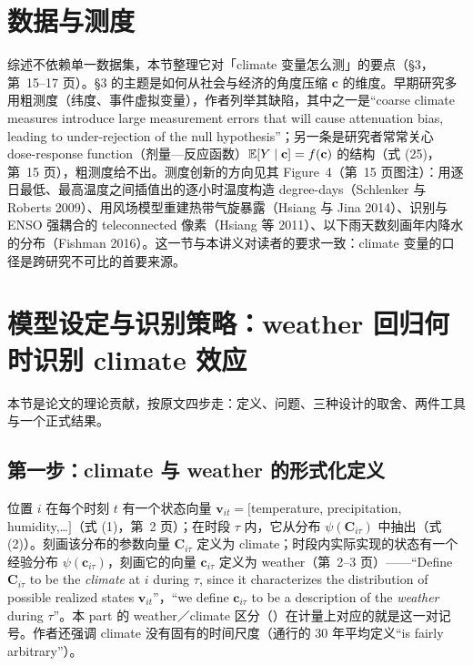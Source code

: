 \section{数据与测度}

综述不依赖单一数据集，本节整理它对「climate 变量怎么测」的要点（\S 3，第~15--17 页）。\S 3 的主题是如何从社会与经济的角度压缩 $\mathbf{c}$ 的维度。早期研究多用粗测度（纬度、事件虚拟变量），作者列举其缺陷，其中之一是``coarse climate measures introduce large measurement errors that will cause attenuation bias, leading to under-rejection of the null hypothesis''\citep[第~15 页]{hsiang2016climate}；另一条是研究者常常关心 dose-response function（剂量—反应函数）$\mathbb{E}[Y\mid\mathbf{c}] = f(\mathbf{c})$ 的结构（式 (25)，第~15 页），粗测度给不出。测度创新的方向见其 Figure~4（第~15 页图注）：用逐日最低、最高温度之间插值出的逐小时温度构造 degree-days（Schlenker 与 Roberts 2009）、用风场模型重建热带气旋暴露（Hsiang 与 Jina 2014）、识别与 ENSO 强耦合的 teleconnected 像素（Hsiang 等 2011）、以下雨天数刻画年内降水的分布（Fishman 2016）。这一节与本讲义对读者的要求一致：climate 变量的口径是跨研究不可比的首要来源。

\section{模型设定与识别策略：weather 回归何时识别 climate 效应}

本节是论文的理论贡献，按原文四步走：定义、问题、三种设计的取舍、两件工具与一个正式结果。

\subsection{第一步：climate 与 weather 的形式化定义}

位置 $i$ 在每个时刻 $t$ 有一个状态向量 $\mathbf{v}_{it} = [$temperature, precipitation, humidity,\dots$]$（式 (1)，第~2 页）；在时段 $\tau$ 内，它从分布 $\psi(\mathbf{C}_{i\tau})$ 中抽出（式 (2)）。刻画该分布的参数向量 $\mathbf{C}_{i\tau}$ 定义为 climate；时段内实际实现的状态有一个经验分布 $\psi(\mathbf{c}_{i\tau})$，刻画它的向量 $\mathbf{c}_{i\tau}$ 定义为 weather（第~2--3 页）——``Define $\mathbf{C}_{i\tau}$ to be the \emph{climate} at $i$ during $\tau$, since it characterizes the distribution of possible realized states $\mathbf{v}_{it}$''\citep[第~2 页]{hsiang2016climate}，``we define $\mathbf{c}_{i\tau}$ to be a description of the \emph{weather} during $\tau$''\citep[第~3 页]{hsiang2016climate}。本 part 的 weather／climate 区分（）在计量上对应的就是这一对记号。作者还强调 climate 没有固有的时间尺度（通行的 30 年平均定义``is fairly arbitrary''\citep[第~3 页]{hsiang2016climate}）。

